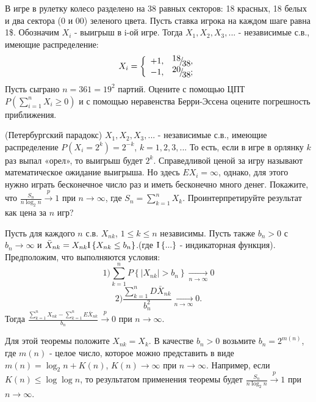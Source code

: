 \begin{problem}
В игре в рулетку колесо разделено на 38 равных секторов: 18 красных, 18 белых и два сектора (0 и 00) зеленого цвета. Пусть ставка игрока на каждом шаге равна 1\$. Обозначим $X_{i} $ - выигрыш в i-ой игре. Тогда $X_{1} ,X_{2} ,X_{3} ,...$ - независимые с.в., имеющие распределение: 
\[X_{i} =\left\{\begin{array}{cc} {+1,} & {{\raise0.7ex\hbox{$ 18 $}\!\mathord{\left/ {\vphantom {18 38}} \right. \kern-\nulldelimiterspace}\!\lower0.7ex\hbox{$ 38 $}} ,} \\ {-1,} & {{\raise0.7ex\hbox{$ 20 $}\!\mathord{\left/ {\vphantom {20 38}} \right. \kern-\nulldelimiterspace}\!\lower0.7ex\hbox{$ 38 $}} ;} \end{array}\right. \] 
Пусть сыграно $n=361=19^{2} $ партий. Оцените с помощью ЦПТ $P\left(\sum _{i=1}^{n}X_{i}  \ge 0\right)$ и с помощью неравенства Берри-Эссена оцените погрешность приближения.
\end{problem}

\begin{problem}
(Петербургский парадокс) $X_{1} ,X_{2} ,X_{3} ,...$ - независимые с.в., имеющие распределение $P\left(X_{i} =2^{k} \right)=2^{-k} $, $k=1,2,3,...$ То есть, если в игре в орлянку $k$ раз выпал «орел», то выигрыш будет $2^{k} $. Справедливой ценой за игру называют математическое ожидание выигрыша. Но здесь $EX_{i} =\infty $, однако, для этого нужно играть бесконечное число раз и иметь бесконечно много денег. Покажите, что $\frac{S_{n} }{n\log _{2} n} \mathop{\to }\limits^{p} 1$ при $n\to \infty $, где $S_{n} =\sum _{k=1}^{n}X_{k}  $. Проинтерпретируйте результат как цена за $n$ игр?

\begin{ordre} 

Пусть для каждого $n$ с.в. $X_{nk} $, $1\le k\le n$ независимы. Пусть также $b_{n} >0$ с $b_{n} \to \infty $ и $\bar{X}_{nk} =X_{nk} {\rm I} \left\{X_{nk} \le b_{n} \right\}$.(где ${\rm I} \left\{...\right\}$ - индикаторная функция). Предположим, что выполняются условия:
\[1) \sum _{k=1}^{n}P\left\{\left|X_{nk} \right|>b_{n} \right\} \mathop{\to }\limits_{n\to \infty } 0\] 
\[2) \frac{\sum _{k=1}^{n}D\bar{X}_{nk}  }{b_{n} ^{2} } \mathop{\to }\limits_{n\to \infty } 0.\] 
Тогда $\frac{\sum _{k=1}^{n}X_{nk}  -\sum _{k=1}^{n}E\bar{X}_{nk}  }{b_{n} } \mathop{\to }\limits^{p} 0$ при $n\to \infty $.

\noindent Для этой теоремы положите $X_{nk} =X_{k} $. В качестве $b_{n} >0$ возьмите $b_{n} =2^{m(n)} $, где $m(n)$ - целое число, которое можно представить в виде $m(n)=\log _{2} n+K(n)$, $K(n)\to \infty $ при $n\to \infty $. Например, если $K(n)\le \log \log n$, то результатом применения теоремы будет $\frac{S_{n} }{n\log _{2} n} \mathop{\to }\limits^{p} 1$ при $n\to \infty $.

\end{ordre} 

\end{problem}

